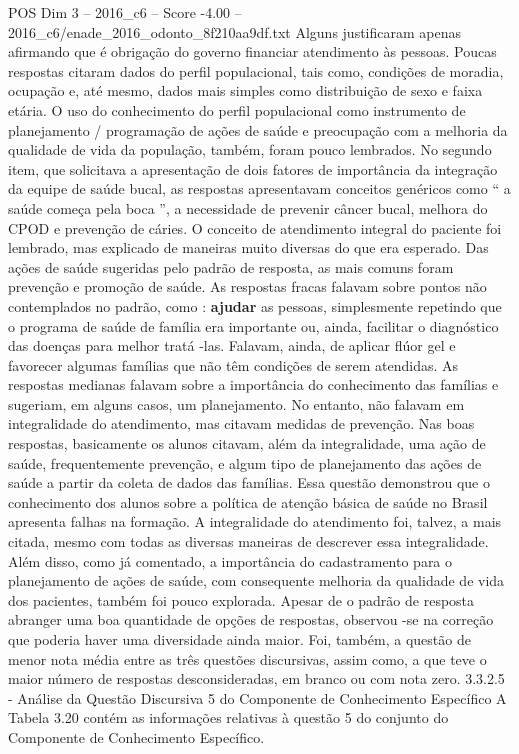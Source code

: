 \begin{textsample}{POS Dim 3 – 2016\_c6 – Score -4.00 – 2016\_c6/enade\_2016\_odonto\_8f210aa9df.txt}
Alguns justificaram apenas afirmando que é obrigação do governo financiar atendimento às pessoas.
Poucas respostas citaram dados do perfil populacional, tais como, condições de moradia, ocupação e, até mesmo, dados mais simples como distribuição de sexo e faixa etária.
O uso do conhecimento do perfil populacional como instrumento de planejamento / programação de ações de saúde e preocupação com a melhoria da qualidade de vida da população, também, foram pouco lembrados.
No segundo item, que solicitava a apresentação de dois fatores de importância da integração da equipe de saúde bucal, as respostas apresentavam conceitos genéricos como “ a saúde começa pela boca ”, a necessidade de prevenir câncer bucal, melhora do CPOD e prevenção de cáries.
O conceito de atendimento integral do paciente foi lembrado, mas explicado de maneiras muito diversas do que era esperado.
Das ações de saúde sugeridas pelo padrão de resposta, as mais comuns foram prevenção e promoção de saúde.
As respostas fracas falavam sobre pontos não contemplados no padrão, como : \textbf{ajudar} as pessoas, simplesmente repetindo que o programa de saúde de família era importante ou, ainda, facilitar o diagnóstico das doenças para melhor tratá -las.
Falavam, ainda, de aplicar flúor gel e favorecer algumas famílias que não têm condições de serem atendidas.
As respostas medianas falavam sobre a importância do conhecimento das famílias e sugeriam, em alguns casos, um planejamento.
No entanto, não falavam em integralidade do atendimento, mas citavam medidas de prevenção.
Nas boas respostas, basicamente os alunos citavam, além da integralidade, uma ação de saúde, frequentemente prevenção, e algum tipo de planejamento das ações de saúde a partir da coleta de dados das famílias.
Essa questão demonstrou que o conhecimento dos alunos sobre a política de atenção básica de saúde no Brasil apresenta falhas na formação.
A integralidade do atendimento foi, talvez, a mais citada, mesmo com todas as diversas maneiras de descrever essa integralidade.
Além disso, como já comentado, a importância do cadastramento para o planejamento de ações de saúde, com consequente melhoria da qualidade de vida dos pacientes, também foi pouco explorada.
Apesar de o padrão de resposta abranger uma boa quantidade de opções de respostas, observou -se na correção que poderia haver uma diversidade ainda maior.
Foi, também, a questão de menor nota média entre as três questões discursivas, assim como, a que teve o maior número de respostas desconsideradas, em branco ou com nota zero. 3.3.2.5 - Análise da Questão Discursiva 5 do Componente de Conhecimento Específico A Tabela 3.20 contém as informações relativas à questão 5 do conjunto do Componente de Conhecimento Específico.

\end{textsample}
